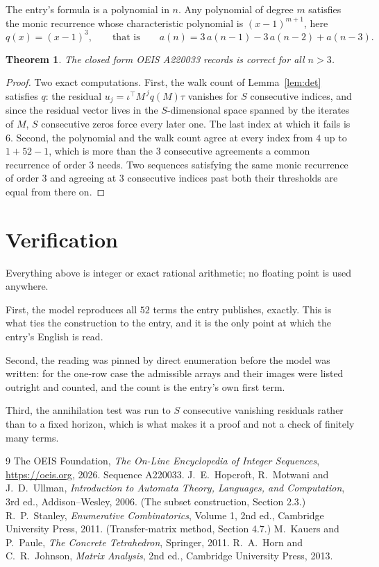 \documentclass[11pt,a4paper]{article}
\theoremstyle{plain}
\newtheorem{theorem}{Theorem}
\theoremstyle{definition}
\begin{document}
The entry's formula is a polynomial in $n$. Any polynomial of degree $m$ satisfies the monic
recurrence whose characteristic polynomial is $(x-1)^{m+1}$, here
\[
q(x)=(x-1)^{3},\qquad\text{that is}\qquad a(n)=3\,a(n-1) - 3\,a(n-2) + a(n-3).
\]

\begin{theorem}
The closed form OEIS A220033 records is correct for all $n>3$.
\end{theorem}

\begin{proof}
Two exact computations. First, the walk count of Lemma~\ref{lem:det} satisfies $q$: the
residual $u_j=\iota^{\!\top}M^{\,j}q(M)\tau$ vanishes for $S$ consecutive indices, and
since the residual vector lives in the $S$-dimensional space spanned by the iterates of $M$,
$S$ consecutive zeros force every later one. The last index at which it fails is $6$.
Second, the polynomial and the walk count agree at every index from $4$ up to
$1 + 52 - 1$, which is more than the $3$ consecutive agreements a
common recurrence of order $3$ needs. Two sequences satisfying the same monic recurrence
of order $3$ and agreeing at $3$ consecutive indices past both their thresholds are
equal from there on.
\end{proof}

\section{Verification}

Everything above is integer or exact rational arithmetic; no floating point is used anywhere.

First, the model reproduces all $52$ terms the entry publishes, exactly. This is what
ties the construction to the entry, and it is the only point at which the entry's English is
read.

Second, the reading was pinned by direct enumeration before the model was written: for the
one-row case the admissible arrays and their images were listed outright and counted, and the
count is the entry's own first term.

Third, the annihilation test was run to $S$ consecutive vanishing residuals rather than to a
fixed horizon, which is what makes it a proof and not a check of finitely many terms.

\begin{thebibliography}{9}
 The OEIS Foundation, \emph{The On-Line Encyclopedia of Integer
Sequences}, \url{https://oeis.org}, 2026. Sequence A220033.
 J.~E.~Hopcroft, R.~Motwani and J.~D.~Ullman, \emph{Introduction to Automata
Theory, Languages, and Computation}, 3rd ed., Addison--Wesley, 2006. (The subset
construction, Section 2.3.)
 R.~P.~Stanley, \emph{Enumerative Combinatorics}, Volume 1, 2nd ed.,
Cambridge University Press, 2011. (Transfer-matrix method, Section 4.7.)
 M.~Kauers and P.~Paule, \emph{The Concrete Tetrahedron}, Springer, 2011.
 R.~A.~Horn and C.~R.~Johnson, \emph{Matrix Analysis}, 2nd ed., Cambridge
University Press, 2013.
\end{thebibliography}
\end{document}
